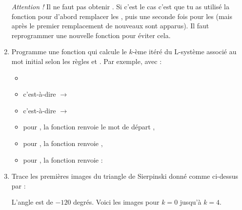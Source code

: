 \documentclass[11pt,class=report,crop=false]{standalone}
\begin{document}
\begin{activite}
\begin{enumerate}
\emph{Attention !} Il ne faut pas obtenir . Si c'est le cas c'est que tu as utilisé la fonction  pour d'abord remplacer les , puis une seconde fois pour les  (mais après le premier remplacement de nouveaux  sont apparus). Il faut reprogrammer une nouvelle fonction pour éviter cela. 

 
  \item Programme une fonction 
  qui calcule le $k$-ème itéré du L-système associé au mot initial  selon les règles  et .
   Par exemple, avec :
  \begin{itemize} 
    \item {}
    \item {} c'est-à-dire  $\rightarrow$ 
    \item {} c'est-à-dire  $\rightarrow$   
    \item pour , la fonction renvoie le mot de départ ,
    \item pour , la fonction renvoie ,
    \item pour , la fonction renvoie :    
  \end{itemize}  

  \item Trace les premières images du triangle de Sierpinski donné comme ci-dessus par :  
  
 L'angle est de $-120$ degrés. Voici les images pour $k=0$ jusqu'à $k=4$.
  

\end{enumerate}
\end{activite}
\end{document}

